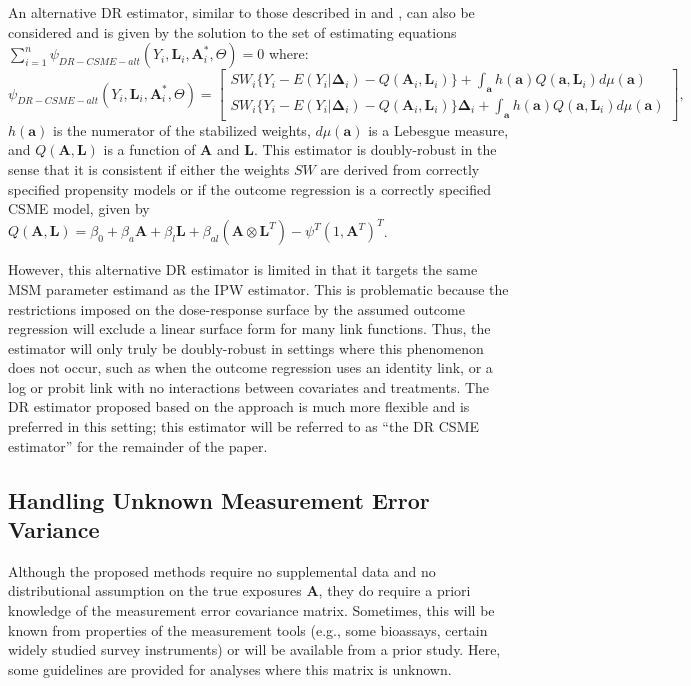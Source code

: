\documentclass[useAMS,usenatbib,referee]{biom}
\begin{document}
An alternative DR estimator, similar to those described in \citet{robins2000b} and \citet{neugebauer2005}, can also be considered and is given by the solution to the set of estimating equations $\sum_{i=1}^{n} \psi_{DR-CSME-alt}(Y_{i}, \bm{L}_{i}, \bm{A}^{*}_{i}, \Theta) = 0$ where:
\begin{equation*}
    \psi_{DR-CSME-alt}(Y_{i}, \bm{L}_{i}, \bm{A}^{*}_{i}, \Theta) =
    \begin{bmatrix}
       SW_{i} \{ Y_{i} - E(Y_{i} | \bm{\Delta}_{i}) - Q(\bm{A}_{i}, \bm{L}_{i}) \} + \int_{\bm{a}} h(\bm{a})Q(\bm{a}, \bm{L}_{i})d\mu (\bm{a}) \\
       SW_{i} \{ Y_{i} - E(Y_{i} | \bm{\Delta}_{i}) - Q(\bm{A}_{i}, \bm{L}_{i}) \} \bm{\Delta}_{i} + \int_{\bm{a}} h(\bm{a})Q(\bm{a}, \bm{L}_{i})d\mu (\bm{a})
    \end{bmatrix},
\end{equation*}
$h(\bm{a})$ is the numerator of the stabilized weights, $d\mu (\bm{a})$ is a Lebesgue measure, and $Q(\bm{A}, \bm{L})$ is a function of $\bm{A}$ and $\bm{L}$. This estimator is doubly-robust in the sense that it is consistent if either the weights $SW$ are derived from correctly specified propensity models or if the outcome regression is a correctly specified CSME model, given by $Q(\bm{A}, \bm{L}) = \beta_{0} + \beta_{a}\bm{A} + \beta_{l}\bm{L} + \beta_{al}(\bm{A} \otimes \bm{L}^{T}) - \psi^{T}(1, \bm{A}^{T})^{T}$.

However, this alternative DR estimator is limited in that it targets the same MSM parameter estimand as the IPW estimator. This is problematic because the restrictions imposed on the dose-response surface by the assumed outcome regression will exclude a linear surface form for many link functions. Thus, the estimator will only truly be doubly-robust in settings where this phenomenon does not occur, such as when the outcome regression uses an identity link, or a log or probit link with no interactions between covariates and treatments. The DR estimator proposed based on the \citet{hirano2001} approach is much more flexible and is preferred in this setting; this estimator will be referred to as ``the DR CSME estimator'' for the remainder of the paper.

\subsection{Handling Unknown Measurement Error Variance}

Although the proposed methods require no supplemental data and no distributional assumption on the true exposures $\bm{A}$, they do require a priori knowledge of the measurement error covariance matrix. Sometimes, this will be known from properties of the measurement tools (e.g., some bioassays, certain widely studied survey instruments) or will be available from a prior study. Here, some guidelines are provided for analyses where this matrix is unknown.
\end{document}
